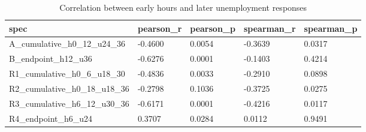 \begin{table}
\centering
\caption{Correlation between early hours and later unemployment responses}
\begin{tabular}{lllll}
\hline
spec & pearson\_r & pearson\_p & spearman\_r & spearman\_p \\
\hline
A\_cumulative\_h0\_12\_u24\_36 & -0.4600 & 0.0054 & -0.3639 & 0.0317 \\
B\_endpoint\_h12\_u36 & -0.6276 & 0.0001 & -0.1403 & 0.4214 \\
R1\_cumulative\_h0\_6\_u18\_30 & -0.4836 & 0.0033 & -0.2910 & 0.0898 \\
R2\_cumulative\_h0\_18\_u18\_36 & -0.2798 & 0.1036 & -0.3725 & 0.0275 \\
R3\_cumulative\_h6\_12\_u30\_36 & -0.6171 & 0.0001 & -0.4216 & 0.0117 \\
R4\_endpoint\_h6\_u24 & 0.3707 & 0.0284 & 0.0112 & 0.9491 \\
\hline
\end{tabular}
\end{table}
